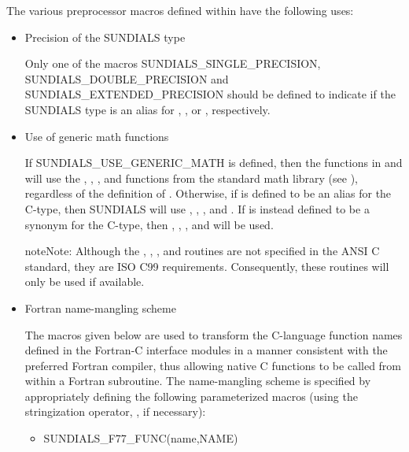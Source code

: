 \documentclass[letterpaper,10pt,english]{sphinxmanual}
\begin{document}
The various preprocessor macros defined within 
have the following uses:
\begin{itemize}
\item {} 
Precision of the SUNDIALS  type

Only one of the macros SUNDIALS\_SINGLE\_PRECISION,
SUNDIALS\_DOUBLE\_PRECISION and
SUNDIALS\_EXTENDED\_PRECISION should be defined to indicate
if the SUNDIALS  type is an alias for ,
, or , respectively.

\item {} 
Use of generic math functions

If SUNDIALS\_USE\_GENERIC\_MATH is defined, then the functions
in  and  will use the ,
, , and  functions from the standard math
library (see ), regardless of the definition of
. Otherwise, if  is defined to be an alias
for the  C-type, then SUNDIALS will use ,
, , and . If  is instead
defined to be a synonym for the  C-type, then
, , , and  will be used.

\begin{notice}{note}{Note:}
Although the , ,
, and  routines are not
specified in the ANSI C standard, they are ISO C99
requirements. Consequently, these routines will only be
used if available.
\end{notice}

\item {} 
Fortran name-mangling scheme

The macros given below are used to transform the C-language function
names defined in the Fortran-C interface modules in a manner
consistent with the preferred Fortran compiler, thus allowing native
C functions to be called from within a Fortran subroutine. The
name-mangling scheme is specified by appropriately defining the
following parameterized macros (using the stringization operator,
\code{\#\#}, if necessary):
\begin{itemize}
\item {} 
SUNDIALS\_F77\_FUNC(name,NAME)


\end{itemize}
\end{itemize}
\end{document}

